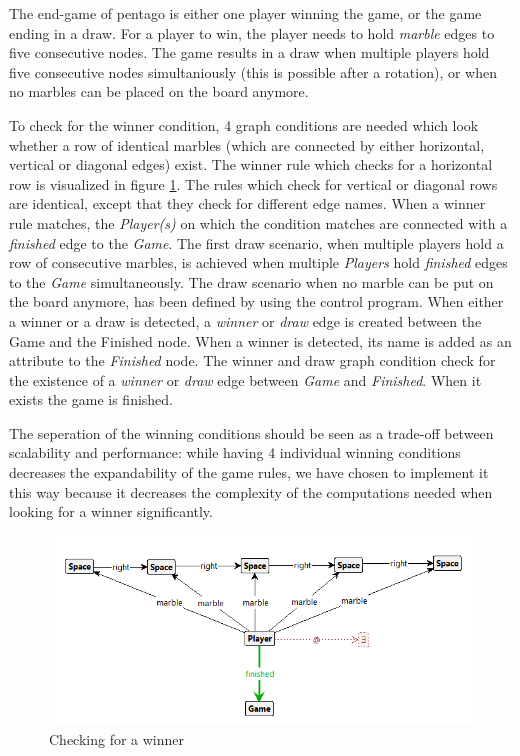 \vspace{6pt}

The end-game of pentago is either one player winning the game, or the game ending in a draw.
For a player to win, the player needs to hold \textit{marble} edges to five consecutive nodes.
The game results in a draw when multiple players hold five consecutive nodes simultaniously (this is possible after a rotation), or when no marbles can be placed on the board anymore.

\vspace{6pt}

To check for the winner condition, 4 graph conditions are needed which look whether a row of identical marbles (which are connected by either horizontal, vertical or diagonal edges) exist.
The winner rule which checks for a horizontal row is visualized in figure \ref{fig:endgame1}.
The rules which check for vertical or diagonal rows are identical, except that they check for different edge names.
When a winner rule matches, the \textit{Player(s)} on which the condition matches are connected with a \textit{finished} edge to the \textit{Game}.
The first draw scenario, when multiple players hold a row of consecutive marbles, is achieved when multiple \textit{Players} hold \textit{finished} edges to the \textit{Game} simultaneously.
The draw scenario when no marble can be put on the board anymore, has been defined by using the control program.
When either a winner or a draw is detected, a \textit{winner} or \textit{draw} edge is created between the Game and the Finished node. When a winner is detected, its name is added as an attribute to the \textit{Finished} node. The winner and draw graph condition check for the existence of a \textit{winner} or \textit{draw} edge between \textit{Game} and \textit{Finished}. When it exists the game is finished.

\vspace{6pt}

The seperation of the winning conditions should be seen as a trade-off between scalability and performance: while having 4 individual winning conditions decreases the expandability of the game rules, we have chosen to implement it this way because it decreases the complexity of the computations needed when looking for a winner significantly.

\begin{figure}[!h]
    \centering
    \includegraphics[scale=0.5,clip]{Images/endgame_puregraph.png}
    \caption{Checking for a winner}
    \label{fig:endgame1}
\end{figure}

